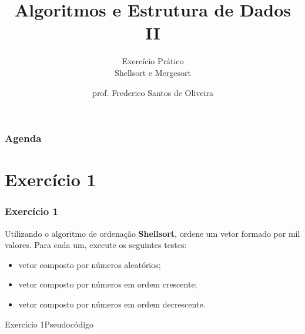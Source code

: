 \documentclass[aspectratio=169]{beamer}
\title[Algoritmos de Ordenação]{Algoritmos e Estrutura de Dados II}
\subtitle{Exercício Prático\\Shellsort e Mergesort}
\author[Frederico Santos de Oliveira]{prof. Frederico Santos de Oliveira}
\institute[UFMT]{Universidade Federal de Mato Grosso\\ Instituto de Engenharia}
\date{}
\begin{document}

\begin{frame}[plain]
  \titlepage
\end{frame}


\begin{frame}
  \frametitle{Agenda}
  \tableofcontents
\end{frame}

\section{Exercício 1}

\begin{frame}
\frametitle{Exercício 1}
Utilizando o algoritmo de ordenação {\bf Shellsort}, ordene um vetor formado por mil valores. Para cada um, execute os seguintes testes:
\begin{itemize}
 \item vetor composto por números aleatórios;
 \item vetor composto por números em ordem crescente;
 \item vetor composto por números em ordem decrescente.
\end{itemize} 
\end{frame}


\begin{frame}[fragile]{Exercício 1}{Pseudocódigo}
\end{frame}
\end{document}
